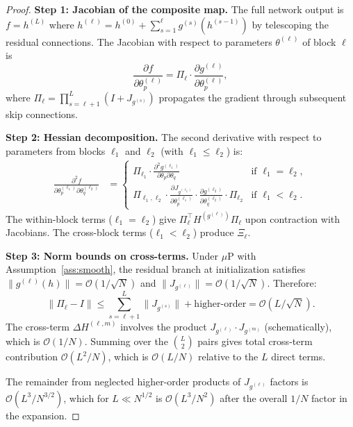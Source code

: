 \documentclass[11pt]{article}
\theoremstyle{definition}
\newcommand{\cO}{\mathcal{O}}
\newcommand{\muP}{\mu\text{P}}
\newcommand{\norm}[1]{\lVert #1 \rVert}
\newcommand{\pp}{\partial}
\begin{document}
\begin{proof}
\textbf{Step 1: Jacobian of the composite map.} The full network output is $f = h^{(L)}$ where $h^{(\ell)} = h^{(0)} + \sum_{s=1}^\ell g^{(s)}(h^{(s-1)})$ by telescoping the residual connections. The Jacobian with respect to parameters $\theta^{(\ell)}$ of block $\ell$ is
\begin{equation}
\frac{\pp f}{\pp \theta^{(\ell)}_p} = \Pi_\ell \cdot \frac{\pp g^{(\ell)}}{\pp \theta^{(\ell)}_p},
\end{equation}
where $\Pi_\ell = \prod_{s=\ell+1}^L (I + J_{g^{(s)}})$ propagates the gradient through subsequent skip connections.

\textbf{Step 2: Hessian decomposition.} The second derivative with respect to parameters from blocks $\ell_1$ and $\ell_2$ (with $\ell_1 \le \ell_2$) is:
\begin{align}
\frac{\pp^2 f}{\pp \theta^{(\ell_1)}_p \pp \theta^{(\ell_2)}_q}
&= \begin{cases}
\Pi_{\ell_1} \cdot \frac{\pp^2 g^{(\ell_1)}}{\pp \theta_p \pp \theta_q} & \text{if } \ell_1 = \ell_2, \\[6pt]
\Pi_{\ell_1,\ell_2} \cdot \frac{\pp J_{g^{(\ell_2)}}}{\pp \theta^{(\ell_1)}_p} \cdot \frac{\pp g^{(\ell_2)}}{\pp \theta^{(\ell_2)}_q} \cdot \Pi_{\ell_2} & \text{if } \ell_1 < \ell_2.
\end{cases}
\end{align}
The within-block terms ($\ell_1 = \ell_2$) give $\Pi_\ell^\top H^{(g^{(\ell)})} \Pi_\ell$ upon contraction with Jacobians. The cross-block terms ($\ell_1 < \ell_2$) produce $\Xi_\ell$.

\textbf{Step 3: Norm bounds on cross-terms.} Under $\muP$ with Assumption~\ref{ass:smooth}, the residual branch at initialization satisfies $\norm{g^{(\ell)}(h)} = \cO(1/\sqrt{N})$ and $\norm{J_{g^{(\ell)}}} = \cO(1/\sqrt{N})$. Therefore:
\begin{equation}
\norm{\Pi_\ell - I} \le \sum_{s=\ell+1}^L \norm{J_{g^{(s)}}} + \text{higher-order} = \cO(L/\sqrt{N}).
\end{equation}
The cross-term $\Delta H^{(\ell,m)}$ involves the product $J_{g^{(\ell)}} \cdot J_{g^{(m)}}$ (schematically), which is $\cO(1/N)$. Summing over the $\binom{L}{2}$ pairs gives total cross-term contribution $\cO(L^2/N)$, which is $\cO(L/N)$ relative to the $L$ direct terms.

The remainder from neglected higher-order products of $J_{g^{(\ell)}}$ factors is $\cO(L^3/N^{3/2})$, which for $L \ll N^{1/2}$ is $\cO(L^3/N^2)$ after the overall $1/N$ factor in the expansion.
\end{proof}
\end{document}

